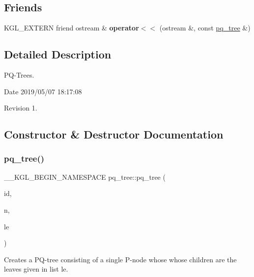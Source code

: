\subsection*{Friends}
\begin{DoxyCompactItemize}
\item 
\mbox{\label{classpq__tree_a2e8bee8ed51cc9d2567b69099c4d7cca}} 
K\+G\+L\+\_\+\+E\+X\+T\+E\+RN friend ostream \& {\bfseries operator$<$$<$} (ostream \&, const \mbox{\hyperlink{classpq__tree}{pq\+\_\+tree}} \&)
\end{DoxyCompactItemize}


\subsection{Detailed Description}
P\+Q-\/\+Trees. 

\begin{DoxyParagraph}{Date}
2019/05/07 18\+:17\+:08 
\end{DoxyParagraph}
\begin{DoxyParagraph}{Revision}
1. 
\end{DoxyParagraph}


\subsection{Constructor \& Destructor Documentation}
\mbox{\label{classpq__tree_a2929a77b0e62274989884fd63db7fbe1}} 
\subsubsection{\texorpdfstring{pq\+\_\+tree()}{pq\_tree()}}
{\footnotesize\ttfamily \+\_\+\+\_\+\+K\+G\+L\+\_\+\+B\+E\+G\+I\+N\+\_\+\+N\+A\+M\+E\+S\+P\+A\+CE pq\+\_\+tree\+::pq\+\_\+tree (\begin{DoxyParamCaption}\item[{int}]{id,  }\item[{\mbox{\hyperlink{classnode}{node}}}]{n,  }\item[{const list$<$ \mbox{\hyperlink{classpq__leaf}{pq\+\_\+leaf}} $\ast$$>$ \&}]{le }\end{DoxyParamCaption})}



Creates a P\+Q-\/tree consisting of a single P-\/node whose whose children are the leaves given in list {\ttfamily le}. 


